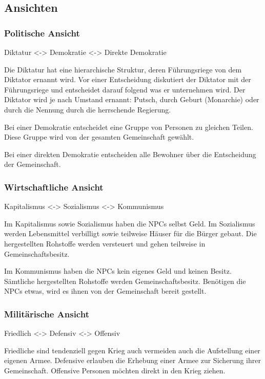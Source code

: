 \documentclass[11pt]{article}
\begin{document}
\subsection{Ansichten}
\subsubsection{Politische Ansicht}
Diktatur <-> Demokratie <-> Direkte Demokratie

Die Diktatur hat eine hierarchische Struktur, deren Führungsriege von dem Diktator ernannt wird. Vor einer Entscheidung diskutiert der Diktator mit der Führungsriege und entscheidet darauf folgend was er unternehmen wird. Der Diktator wird je nach Umstand ernannt: Putsch, durch Geburt (Monarchie) oder durch die Nennung durch die herrschende Regierung.

Bei einer Demokratie entscheidet eine Gruppe von Personen zu gleichen Teilen. Diese Gruppe wird von der gesamten Gemeinschaft gewählt.

Bei einer direkten Demokratie entscheiden alle Bewohner über die Entscheidung der Gemeinschaft.

\subsubsection{Wirtschaftliche Ansicht}
Kapitalismus <-> Sozialismus <-> Kommunismus

Im Kapitalismus sowie Sozialismus haben die NPCs selbst Geld. Im Sozialismus werden Lebensmittel verbilligt sowie teilweise Häuser für die Bürger gebaut. Die hergestellten Rohstoffe werden versteuert und gehen teilweise in Gemeinschaftsbesitz.

Im Kommunismus haben die NPCs kein eigenes Geld und keinen Besitz. Sämtliche hergestellten Rohstoffe werden Gemeinschaftsbesitz. Benötigen die NPCs etwas, wird es ihnen von der Gemeinschaft bereit gestellt.

\subsubsection{Militärische Ansicht}
Friedlich <-> Defensiv <-> Offensiv

Friedliche sind tendenziell gegen Krieg auch vermeiden auch die Aufstellung einer eigenen Armee. Defensive erlauben die Erhebung einer Armee zur Sicherung ihrer Gemeinschaft. Offensive Personen möchten direkt in den Krieg ziehen.
\end{document}
